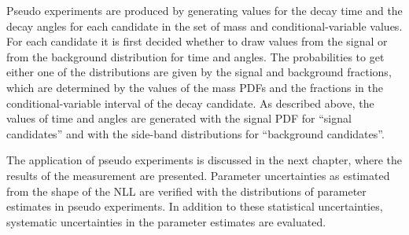 Pseudo experiments are produced by generating values for the decay time and the decay angles for each candidate in the set of mass and
conditional-variable values. For each candidate it is first decided whether to draw values from the signal or from the background
distribution for time and angles. The probabilities to get either one of the distributions are given by the signal and background
fractions, which are determined by the values of the mass PDFs and the fractions in the conditional-variable interval of the decay
candidate.  As described above, the values of time and angles are generated with the signal PDF for ``signal candidates'' and with the
side-band distributions for ``background candidates''.

The application of pseudo experiments is discussed in the next chapter, where the results of the \BstoJpsiKK{} measurement are presented.
Parameter uncertainties as estimated from the shape of the NLL are verified with the distributions of parameter estimates in pseudo
experiments. In addition to these statistical uncertainties, systematic uncertainties in the parameter estimates are evaluated.
